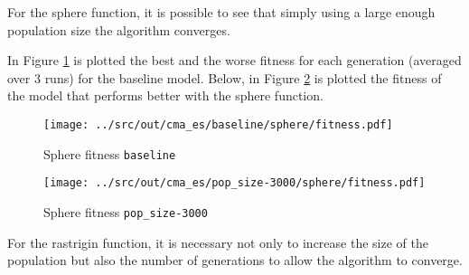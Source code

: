 For the sphere function, it is possible to see that simply using a large enough population size the algorithm converges.

In Figure \ref{fig:cmaes-s-fitness/baseline} is plotted the best and the worse fitness for each generation (averaged over 3 runs) for the baseline model. Below, in Figure \ref{fig:cmaes-s-fitness/3000} is plotted the fitness of the model that performs better with the sphere function.

 
\begin{figure}[H]
	\centering
	\begin{minipage}[b]{.6\textwidth}
		\texttt{[image: ../src/out/cma\_es/baseline/sphere/fitness.pdf]}	
	\end{minipage}
	\caption{Sphere fitness \texttt{baseline}}
	\label{fig:cmaes-s-fitness/baseline}
\end{figure}
\begin{figure}[H]
	\centering
	\begin{minipage}[b]{.6\textwidth}
		\texttt{[image: ../src/out/cma\_es/pop\_size-3000/sphere/fitness.pdf]}	
	\end{minipage}
	\caption{Sphere fitness \texttt{pop\_size-3000}}
	\label{fig:cmaes-s-fitness/3000}
\end{figure}

For the rastrigin function, it is necessary not only to increase the size of the population but also the number of generations to allow the algorithm to converge.

